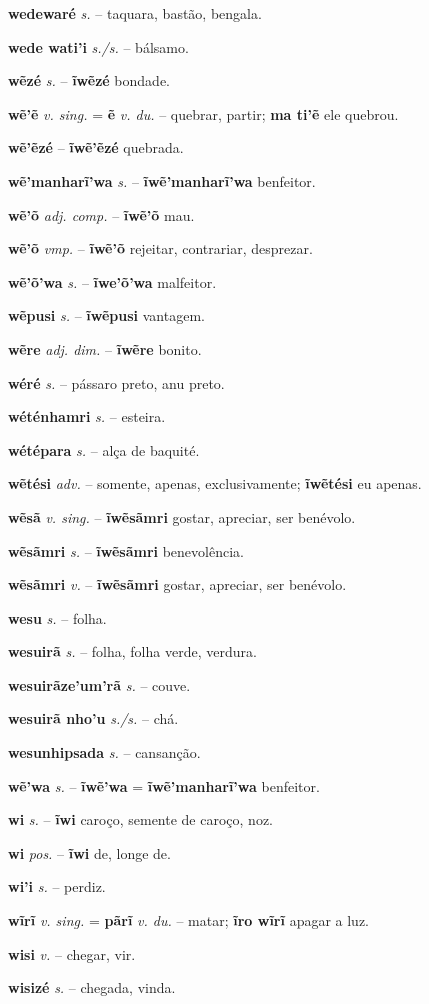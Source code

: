 \textbf{wedewaré} \textit{s.} -- taquara, bastão, bengala.

\textbf{wede wati'i} \textit{s./s.} -- bálsamo.

\textbf{wẽzé} \textit{s.} -- \textbf{ĩwẽzé} bondade.

\textbf{wẽ'ẽ} \textit{v. sing.} = \textbf{ẽ} \textit{v. du.} -- quebrar, partir; \textbf{ma ti'ẽ} ele quebrou.

\textbf{wẽ'ẽzé} \textit{} -- \textbf{ĩwẽ'ẽzé} quebrada.

\textbf{wẽ'manharĩ'wa} \textit{s.} -- \textbf{ĩwẽ'manharĩ'wa} benfeitor.

\textbf{wẽ'õ} \textit{adj. comp.} -- \textbf{ĩwẽ'õ} mau.

\textbf{wẽ'õ} \textit{vmp.} -- \textbf{ĩwẽ'õ} rejeitar, contrariar, desprezar.

\textbf{wẽ'õ'wa} \textit{s.} -- \textbf{ĩwe'õ'wa} malfeitor.

\textbf{wẽpusi} \textit{s.} -- \textbf{ĩwẽpusi} vantagem.

\textbf{wẽre} \textit{adj. dim.} -- \textbf{ĩwẽre} bonito.

\textbf{wéré} \textit{s.} -- pássaro preto, anu preto.

\textbf{wéténhamri} \textit{s.} -- esteira.

\textbf{wétépara} \textit{s.} -- alça de baquité.

\textbf{wẽtési} \textit{adv.} -- somente, apenas, exclusivamente; \textbf{ĩwẽtési} eu apenas.

\textbf{wẽsã} \textit{v. sing.} -- \textbf{ĩwẽsãmri} gostar, apreciar, ser benévolo.

\textbf{wẽsãmri} \textit{s.} -- \textbf{ĩwẽsãmri} benevolência.

\textbf{wẽsãmri} \textit{v.} -- \textbf{ĩwẽsãmri} gostar, apreciar, ser benévolo.

\textbf{wesu} \textit{s.} -- folha.

\textbf{wesuirã} \textit{s.} -- folha, folha verde, verdura.

\textbf{wesuirãze'um'rã} \textit{s.} -- couve.

\textbf{wesuirã nho'u} \textit{s./s.} -- chá.

\textbf{wesunhipsada} \textit{s.} -- cansanção.

\textbf{wẽ'wa} \textit{s.} -- \textbf{ĩwẽ'wa} = \textbf{ĩwẽ'manharĩ'wa} benfeitor.

\textbf{wi} \textit{s.} -- \textbf{ĩwi} caroço, semente de caroço, noz.

\textbf{wi} \textit{pos.} -- \textbf{ĩwi} de, longe de.

\textbf{wi'i} \textit{s.} -- perdiz.

\textbf{wĩrĩ} \textit{v. sing.} = \textbf{pãrĩ} \textit{v. du.} -- matar; \textbf{ĩro wĩrĩ} apagar a luz.

\textbf{wisi} \textit{v.} -- chegar, vir.

\textbf{wisizé} \textit{s.} -- chegada, vinda.
